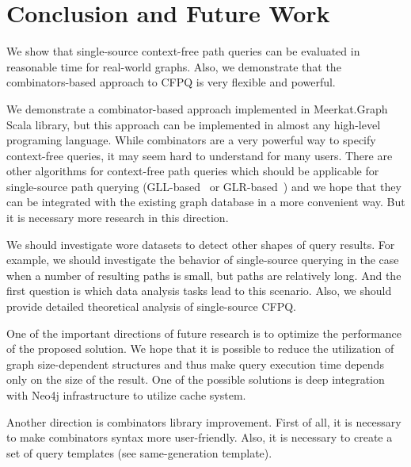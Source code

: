\section{Conclusion and Future Work}

We show that single-source context-free path queries can be evaluated in reasonable time for real-world graphs. 
Also, we demonstrate that the combinators-based approach to CFPQ is very flexible and powerful.

We demonstrate a combinator-based approach implemented in Meerkat.Graph Scala library, but this approach can be implemented in almost any high-level programing language.
While combinators are a very powerful way to specify context-free queries, it may seem hard to understand for many users.
There are other algorithms for context-free path queries which should be applicable for single-source path querying (GLL-based~\cite{Grigorev:2017:CPQ:3166094.3166104, MEDEIROS201975} or GLR-based~\cite{10.1007/978-3-319-41579-6_22, 10.1007/978-3-319-91662-0_17}) and we hope that they can be integrated with the existing graph database in a more convenient way.
But it is necessary more research in this direction.

We should investigate wore datasets to detect other shapes of query results.
For example, we should investigate the behavior of single-source querying in the case when a number of resulting paths is small, but paths are relatively long.
And the first question is which data analysis tasks lead to this scenario.
Also, we should provide detailed theoretical analysis of single-source CFPQ.

One of the important directions of future research is to optimize the performance of the proposed solution.
We hope that it is possible to reduce the utilization of graph size-dependent structures and thus make query execution time depends only on the size of the result.
One of the possible solutions is deep integration with Neo4j infrastructure to utilize cache system.

Another direction is combinators library improvement.
First of all, it is necessary to make combinators syntax more user-friendly.
Also, it is necessary to create a set of query templates (see same-generation template).